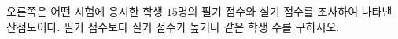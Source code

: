 \noindent\begin{minipage}[t]{0.58\linewidth}\vspace{0pt}\raggedright 오른쪽은 어떤 시험에 응시한 학생 $15$명의 필기 점수와 실기 점수를 조사하여 나타낸 산점도이다. 필기 점수보다 실기 점수가 높거나 같은 학생 수를 구하시오.\end{minipage}\hfill\begin{minipage}[t]{0.4\linewidth}\vspace{0pt}\centering \resizebox{\ifdim\width>\linewidth\linewidth\else\width\fi}{!}{}\end{minipage}\par
